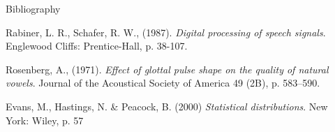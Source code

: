\documentclass[final]{beamer}
\begin{document}
\begin{frame}[t]
\begin{columns}[t]
\begin{column}{.465\textwidth}
\begin{block}{Bibliography}
\begin{scriptsize}
\begin{thebibliography}{9}
    Rabiner, L. R., Schafer, R. W., (1987).
    \emph{Digital processing of speech signals}.
    Englewood Cliffs: Prentice-Hall, p. 38-107.

    Rosenberg, A., (1971).
    \emph{Effect of glottal pulse shape on the quality of natural vowels}.
    Journal of the Acoustical Society of America 49 (2B), p. 583–590.
    
    Evans, M., Hastings, N. \& Peacock, B. (2000)
    \emph{Statistical distributions}.
    New York: Wiley, p. 57

\end{thebibliography}


\end{scriptsize}

\end{block}



\end{column} %

\begin{column}{.015\textwidth}\end{column} %

\end{columns} %

\end{frame} %
\end{document}
